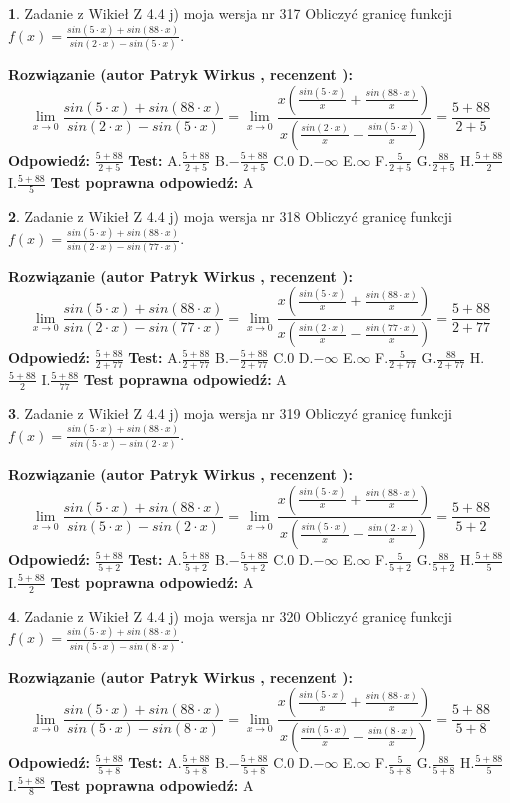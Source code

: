 \documentclass[12pt, a4paper]{article}
\theoremstyle{definition} %
\newtheorem{zad}{}
\newcommand{\zadStart}[1]{\begin{zad}#1\newline}
\newcommand{\zadStop}{\end{zad}}
\newcommand{\rozwStart}[2]{\noindent \textbf{Rozwiązanie (autor #1 , recenzent #2): }\newline}
\newcommand{\rozwStop}{\newline}
\newcommand{\odpStart}{\noindent \textbf{Odpowiedź:}\newline}
\newcommand{\odpStop}{\newline}
\newcommand{\testStart}{\noindent \textbf{Test:}\newline}
\newcommand{\testStop}{\newline}
\newcommand{\kluczStart}{\noindent \textbf{Test poprawna odpowiedź:}\newline}
\newcommand{\kluczStop}{\newline}
\begin{document}
\zadStart{Zadanie z Wikieł Z 4.4 j) moja wersja nr 317}
Obliczyć granicę funkcji $f(x)=\frac{sin(5\cdot x) +sin(88\cdot x)}{sin(2\cdot x) -sin(5\cdot x)}$.
\zadStop
\rozwStart{Patryk Wirkus}{}
$$\lim\limits_{x\to 0}\frac{sin(5\cdot x) +sin(88\cdot x)}{sin(2\cdot x) -sin(5\cdot x)}=\lim\limits_{x\to 0}\frac{x(\frac{sin(5\cdot x)}{x}+\frac{sin(88\cdot x)}{x})}{x(\frac{sin(2\cdot x)}{x}-\frac{sin(5\cdot x)}{x})}=\frac{5+88}{2+5}$$
\rozwStop
\odpStart
$\frac{5+88}{2+5}$
\odpStop
\testStart
A.$\frac{5+88}{2+5}$
B.$-\frac{5+88}{2+5}$
C.$0$
D.$-\infty$
E.$\infty$
F.$\frac{5}{2+5}$
G.$\frac{88}{2+5}$
H.$\frac{5+88}{2}$
I.$\frac{5+88}{5}$
\testStop
\kluczStart
A
\kluczStop



\zadStart{Zadanie z Wikieł Z 4.4 j) moja wersja nr 318}
Obliczyć granicę funkcji $f(x)=\frac{sin(5\cdot x) +sin(88\cdot x)}{sin(2\cdot x) -sin(77\cdot x)}$.
\zadStop
\rozwStart{Patryk Wirkus}{}
$$\lim\limits_{x\to 0}\frac{sin(5\cdot x) +sin(88\cdot x)}{sin(2\cdot x) -sin(77\cdot x)}=\lim\limits_{x\to 0}\frac{x(\frac{sin(5\cdot x)}{x}+\frac{sin(88\cdot x)}{x})}{x(\frac{sin(2\cdot x)}{x}-\frac{sin(77\cdot x)}{x})}=\frac{5+88}{2+77}$$
\rozwStop
\odpStart
$\frac{5+88}{2+77}$
\odpStop
\testStart
A.$\frac{5+88}{2+77}$
B.$-\frac{5+88}{2+77}$
C.$0$
D.$-\infty$
E.$\infty$
F.$\frac{5}{2+77}$
G.$\frac{88}{2+77}$
H.$\frac{5+88}{2}$
I.$\frac{5+88}{77}$
\testStop
\kluczStart
A
\kluczStop



\zadStart{Zadanie z Wikieł Z 4.4 j) moja wersja nr 319}
Obliczyć granicę funkcji $f(x)=\frac{sin(5\cdot x) +sin(88\cdot x)}{sin(5\cdot x) -sin(2\cdot x)}$.
\zadStop
\rozwStart{Patryk Wirkus}{}
$$\lim\limits_{x\to 0}\frac{sin(5\cdot x) +sin(88\cdot x)}{sin(5\cdot x) -sin(2\cdot x)}=\lim\limits_{x\to 0}\frac{x(\frac{sin(5\cdot x)}{x}+\frac{sin(88\cdot x)}{x})}{x(\frac{sin(5\cdot x)}{x}-\frac{sin(2\cdot x)}{x})}=\frac{5+88}{5+2}$$
\rozwStop
\odpStart
$\frac{5+88}{5+2}$
\odpStop
\testStart
A.$\frac{5+88}{5+2}$
B.$-\frac{5+88}{5+2}$
C.$0$
D.$-\infty$
E.$\infty$
F.$\frac{5}{5+2}$
G.$\frac{88}{5+2}$
H.$\frac{5+88}{5}$
I.$\frac{5+88}{2}$
\testStop
\kluczStart
A
\kluczStop



\zadStart{Zadanie z Wikieł Z 4.4 j) moja wersja nr 320}
Obliczyć granicę funkcji $f(x)=\frac{sin(5\cdot x) +sin(88\cdot x)}{sin(5\cdot x) -sin(8\cdot x)}$.
\zadStop
\rozwStart{Patryk Wirkus}{}
$$\lim\limits_{x\to 0}\frac{sin(5\cdot x) +sin(88\cdot x)}{sin(5\cdot x) -sin(8\cdot x)}=\lim\limits_{x\to 0}\frac{x(\frac{sin(5\cdot x)}{x}+\frac{sin(88\cdot x)}{x})}{x(\frac{sin(5\cdot x)}{x}-\frac{sin(8\cdot x)}{x})}=\frac{5+88}{5+8}$$
\rozwStop
\odpStart
$\frac{5+88}{5+8}$
\odpStop
\testStart
A.$\frac{5+88}{5+8}$
B.$-\frac{5+88}{5+8}$
C.$0$
D.$-\infty$
E.$\infty$
F.$\frac{5}{5+8}$
G.$\frac{88}{5+8}$
H.$\frac{5+88}{5}$
I.$\frac{5+88}{8}$
\testStop
\kluczStart
A
\kluczStop
\end{document}
